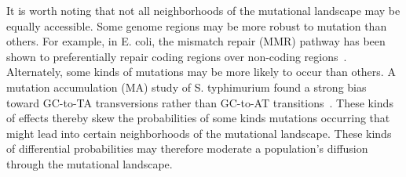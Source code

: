 \documentclass[10pt,letterpaper]{article}
\begin{document}
It is worth noting that not all neighborhoods of the mutational landscape may be equally accessible. Some genome regions may be more robust to mutation than others.
For example, in E. coli, the mismatch repair (MMR) pathway has been shown to preferentially repair coding regions over non-coding regions~\cite{lee_rate_2012}. Alternately, some kinds of mutations may be more likely to occur than others. A mutation accumulation (MA) study of S. typhimurium found a strong bias toward GC-to-TA transversions rather than GC-to-AT transitions~\cite{lind_whole-genome_2008}.
These kinds of effects thereby skew the probabilities of some kinds mutations occurring that might lead into certain neighborhoods of the mutational landscape. These kinds of differential probabilities may therefore moderate a population's diffusion through the mutational landscape.
%
%
\end{document}
